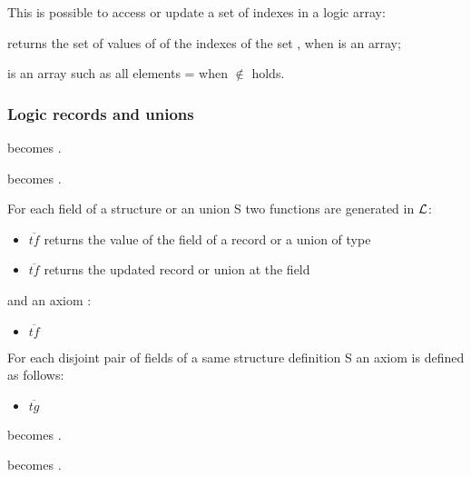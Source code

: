    This is possible to access or update a set of indexes in a logic array:
   \begin{description}
     \item{}
       returns the set of values of  of the indexes of
       the set , when  is an array;

       \item{} is an array such as all
         elements =  
         when  $\notin$  holds.
   \end{description}



\subsubsection{Logic records and unions }\label{ssec-acsl-rec} 
 
 \begin{description}
   \item {} becomes .
   \item{} becomes .
   \item{For each field  of a structure or an union S}
     two functions are generated in $\cal{L}$:
     \begin{itemize}
       \item {}$\overline{tf}$ returns the value 
         of the field  of a record or a union of type  
         \item {}$\overline{tf}$ returns the updated record or union at the field
     \end{itemize}
     and an axiom : 
     \begin{itemize}
       \item{}$\overline{tf}$
     \end{itemize}
    \item{For each disjoint pair of fields  of a same structure definition S} an axiom is defined as follows:
      \begin{itemize}
      \item{}$\overline{tg}$
      \end{itemize} 
    \item{} becomes . 
    \item{} becomes . 
 \end{description}

